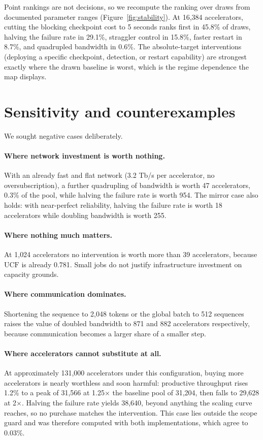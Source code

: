 \documentclass[11pt]{article}
\begin{document}
Point rankings are not decisions, so we recompute the ranking over draws from
documented parameter ranges (Figure~\ref{fig:stability}). At 16{,}384 accelerators, cutting the blocking checkpoint cost to 5 seconds
ranks first in 45.8\% of draws, halving the failure rate in 29.1\%, straggler
control in 15.8\%, faster restart in 8.7\%, and quadrupled bandwidth in 0.6\%.
The absolute-target interventions (deploying a specific checkpoint, detection,
or restart capability) are strongest exactly where the drawn baseline is worst,
which is the regime dependence the map displays.

\section{Sensitivity and counterexamples}

We sought negative cases deliberately.

\paragraph{Where network investment is worth nothing.} With an already fast and flat network (3.2 Tb/s per accelerator, no
oversubscription), a further quadrupling of bandwidth is worth 47 accelerators,
0.3\% of the pool, while halving the failure rate is worth 954. The mirror case
also holds: with near-perfect reliability, halving the failure rate is worth 18
accelerators while doubling bandwidth is worth 255.

\paragraph{Where nothing much matters.} At 1{,}024 accelerators no
intervention is worth more than 39 accelerators, because $\mathrm{UCF}$ is
already 0.781. Small jobs do not justify infrastructure investment on capacity
grounds.

\paragraph{Where communication dominates.} Shortening the sequence to 2{,}048
tokens or the global batch to 512 sequences raises the value of doubled
bandwidth to 871 and 882 accelerators respectively, because
communication becomes a larger share of a smaller step.

\paragraph{Where accelerators cannot substitute at all.} At approximately 131{,}000 accelerators under this configuration, buying more
accelerators is nearly worthless and soon harmful: productive throughput rises
1.2\% to a peak of 31{,}566 at 1.25$\times$ the baseline pool of 31{,}204, then
falls to 29{,}628 at 2$\times$. Halving the failure rate yields 38{,}640, beyond
anything the scaling curve reaches, so no purchase matches the intervention.
This case lies outside the scope guard and was therefore computed with both
implementations, which agree to 0.03\%.
\end{document}
